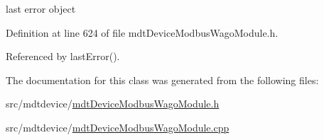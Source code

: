 last error object 



Definition at line 624 of file mdt\-Device\-Modbus\-Wago\-Module.\-h.



Referenced by last\-Error().



The documentation for this class was generated from the following files\-:\begin{DoxyCompactItemize}
\item 
src/mdtdevice/\hyperlink{mdt_device_modbus_wago_module_8h}{mdt\-Device\-Modbus\-Wago\-Module.\-h}\item 
src/mdtdevice/\hyperlink{mdt_device_modbus_wago_module_8cpp}{mdt\-Device\-Modbus\-Wago\-Module.\-cpp}\end{DoxyCompactItemize}
